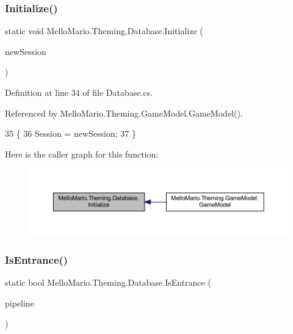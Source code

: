 \subsubsection{Initialize()}
{\footnotesize\ttfamily static void Mello\+Mario.\+Theming.\+Database.\+Initialize (\begin{DoxyParamCaption}\item[{\textbf{ I\+Session}}]{new\+Session }\end{DoxyParamCaption})\hspace{0.3cm}{\ttfamily [static]}}



Definition at line 34 of file Database.\+cs.



Referenced by Mello\+Mario.\+Theming.\+Game\+Model.\+Game\+Model().


\begin{DoxyCode}
35         \{
36             Session = newSession;
37         \}
\end{DoxyCode}
Here is the caller graph for this function\+:
\nopagebreak
\begin{figure}[H]
\begin{center}
\leavevmode
\includegraphics[width=350pt]{classMelloMario_1_1Theming_1_1Database_a1a15a0f194ce2c9e9cc701656794f092_icgraph}
\end{center}
\end{figure}
\mbox{\label{classMelloMario_1_1Theming_1_1Database_a1c6942339fed6d28302debda9c4e6756}} 
\subsubsection{Is\+Entrance()}
{\footnotesize\ttfamily static bool Mello\+Mario.\+Theming.\+Database.\+Is\+Entrance (\begin{DoxyParamCaption}\item[{\textbf{ Pipeline}}]{pipeline }\end{DoxyParamCaption})\hspace{0.3cm}{\ttfamily [static]}}



